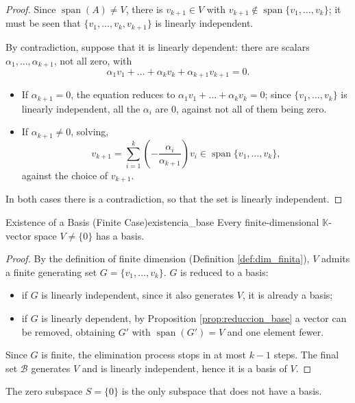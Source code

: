 \documentclass[11pt, a4paper]{article}
\begin{document}
\begin{proof}
Since $\operatorname{span}(A) \neq V$, there is $v_{k+1} \in V$ with $v_{k+1} \notin \operatorname{span}\{v_1, \dots, v_k\}$; it must be seen that $\{v_1, \dots, v_k, v_{k+1}\}$ is linearly independent.

By contradiction, suppose that it is linearly dependent: there are scalars $\alpha_1, \dots, \alpha_{k+1}$, not all zero, with
\[
\alpha_1 v_1 + \dots + \alpha_k v_k + \alpha_{k+1} v_{k+1} = 0.
\]
\begin{itemize}
    \item If $\alpha_{k+1} = 0$, the equation reduces to $\alpha_1 v_1 + \dots + \alpha_k v_k = 0$; since $\{v_1, \dots, v_k\}$ is linearly independent, all the $\alpha_i$ are $0$, against not all of them being zero.
    \item If $\alpha_{k+1} \neq 0$, solving,
    \[
    v_{k+1} = \sum_{i=1}^k \left( -\frac{\alpha_i}{\alpha_{k+1}} \right) v_i \in \operatorname{span}\{v_1, \dots, v_k\},
    \]
    against the choice of $v_{k+1}$.
\end{itemize}
In both cases there is a contradiction, so that the set is linearly independent.
\end{proof}

\begin{teorema}{Existence of a Basis (Finite Case)}{existencia_base}
Every finite-dimensional $\mathbb{K}$-vector space $V \neq \{0\}$ has a basis.
\end{teorema}

\begin{proof}
By the definition of finite dimension (Definition \ref{def:dim_finita}), $V$ admits a finite generating set $G = \{v_1, \dots, v_k\}$. $G$ is reduced to a basis:
\begin{itemize}
    \item if $G$ is linearly independent, since it also generates $V$, it is already a basis;
    \item if $G$ is linearly dependent, by Proposition \ref{prop:reduccion_base} a vector can be removed, obtaining $G'$ with $\operatorname{span}(G') = V$ and one element fewer.
\end{itemize}
Since $G$ is finite, the elimination process stops in at most $k-1$ steps. The final set $\mathcal{B}$ generates $V$ and is linearly independent, hence it is a basis of $V$.
\end{proof}

\obs The zero subspace $S = \{0\}$ is the only subspace that does not have a basis.
\end{document}
